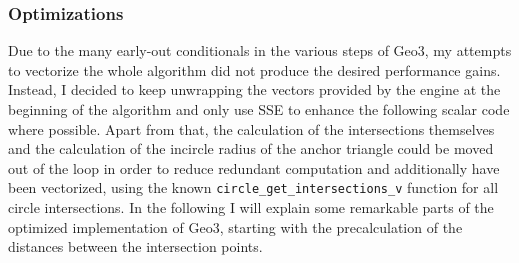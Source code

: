 \subsubsection{Optimizations}
Due to the many early-out conditionals in the various steps of Geo3, my attempts to vectorize the whole algorithm did not produce the desired performance gains. Instead, I decided to keep unwrapping the vectors provided by the engine at the beginning of the algorithm and only use SSE to enhance the following scalar code where possible. Apart from that, the calculation of the intersections themselves and the calculation of the incircle radius of the anchor triangle could be moved out of the loop in order to reduce redundant computation and additionally have been vectorized, using the known \texttt{circle\_get\_intersections\_v} function for all circle intersections. In the following I will explain some remarkable parts of the optimized implementation of Geo3, starting with the precalculation of the distances between the intersection points.

